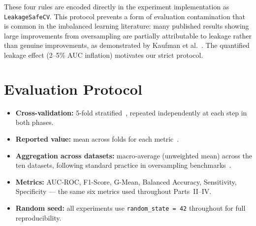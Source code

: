 These four rules are encoded directly in the experiment implementation as \texttt{LeakageSafeCV}.
This protocol prevents a form of evaluation contamination that is common in the imbalanced learning literature: many published results showing large improvements from oversampling are partially attributable to leakage rather than genuine improvements, as demonstrated by Kaufman et al.~\cite{kaufman2012leakage}.
The quantified leakage effect (2--5\% AUC inflation) motivates our strict protocol.


\section{Evaluation Protocol}
\label{sec:setup_causal:evaluation}

\begin{itemize}[leftmargin=*]
    \item \textbf{Cross-validation:} 5-fold stratified~\cite{kohavi1995study}, repeated independently at each step in both phases.
    \item \textbf{Reported value:} mean across folds for each metric~\cite{kohavi1995study}.
    \item \textbf{Aggregation across datasets:} macro-average (unweighted mean) across the ten datasets, following standard practice in oversampling benchmarks~\cite{fernandez2018learning}.
    \item \textbf{Metrics:} AUC-ROC, F1-Score, G-Mean, Balanced Accuracy, Sensitivity, Specificity --- the same six metrics used throughout Parts~II--IV.
    \item \textbf{Random seed:} all experiments use \texttt{random\_state = 42} throughout for full reproducibility.
\end{itemize}
